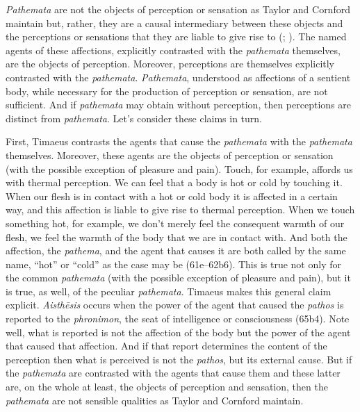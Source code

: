 \emph{Pathemata} are not the objects of perception or sensation as Taylor and Cornford maintain but, rather, they are a causal intermediary between these objects and the perceptions or sensations that they are liable to give rise to (\citealt[138]{OBrien:1984ji}; \citealt{Brisson:1997qr}). The named agents of these affections, explicitly contrasted with the \emph{pathemata} themselves, are the objects of perception. Moreover, perceptions are themselves explicitly contrasted with the \emph{pathemata}. \emph{Pathemata}, understood as affections of a sentient body, while necessary for the production of perception or sensation, are not sufficient. And if \emph{pathemata} may obtain without perception, then perceptions are distinct from \emph{pathemata}. Let's consider these claims in turn.

First, Timaeus contrasts the agents that cause the \emph{pathemata} with the \emph{pathemata} themselves. Moreover, these agents are the objects of perception or sensation (with the possible exception of pleasure and pain). Touch, for example, affords us with thermal perception. We can feel that a body is hot or cold by touching it. When our flesh is in contact with a hot or cold body it is affected in a certain way, and this affection is liable to give rise to thermal perception. When we touch something hot, for example, we don't merely feel the consequent warmth of our flesh, we feel the warmth of the body that we are in contact with. And both the affection, the \emph{pathema}, and the agent that causes it are both called by the same name, ``hot'' or ``cold'' as the case may be (61e--62b6). This is true not only for the common \emph{pathemata} (with the possible exception of pleasure and pain), but it is true, as well, of the peculiar \emph{pathemata}. Timaeus makes this general claim explicit. \emph{Aisthēsis} occurs when the power of the agent that caused the \emph{pathos} is reported to the \emph{phronimon}, the seat of intelligence or consciousness (65b4). Note well, what is reported is not the affection of the body but the power of the agent that caused that affection. And if that report determines the content of the perception then what is perceived is not the \emph{pathos}, but its external cause. But if the \emph{pathemata} are contrasted with the agents that cause them and these latter are, on the whole at least, the objects of perception and sensation, then the \emph{pathemata} are not sensible qualities as Taylor and Cornford maintain.

